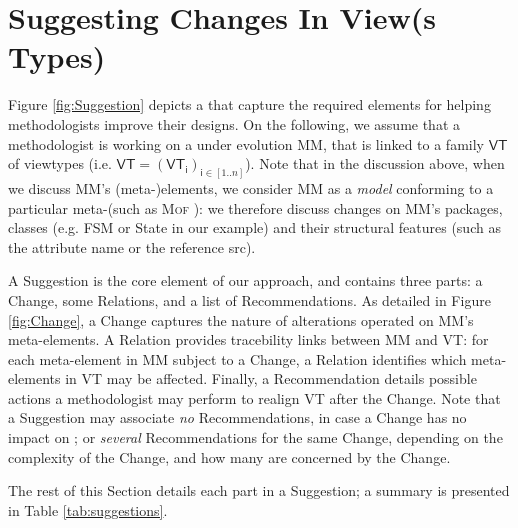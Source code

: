 \section{Suggesting Changes In View(s Types)}
\label{sec:Suggestion}

Figure \ref{fig:Suggestion} depicts a \metamodel that capture the
required elements for helping methodologists improve their designs.
On the following, we assume that a methodologist is working on a \metamodel
under evolution \textsf{MM}, that is linked to a family $\mathsf{VT}$ of viewtypes
(i.e. $\mathsf{VT} = (\mathsf{VT}_\mathsf{i})_{\mathsf{i}\in [1..n]}$). Note that in the discussion above, when we discuss
\textsf{MM}'s (meta-)elements, we consider \textsf{MM} as a \emph{model}
conforming to a particular meta-\metamodel (such as \textsc{Mof} \cite{TR:OMG-MOF:2016}):
we therefore discuss changes on \textsf{MM}'s packages, classes (e.g. 
\textsf{FSM} or \textsf{State} in our example) and their structural features
(such as the attribute \textsf{name} or the reference \textsf{src}).

A \textsf{Suggestion} is the core element of our approach, and contains three 
parts: a \textsf{Change}, some \textsf{Relation}s, and a list of 
\textsf{Recommendation}s. 
%
As detailed in Figure \ref{fig:Change}, a \textsf{Change} captures the nature of
alterations operated on \textsf{MM}'s meta-elements. 
A \textsf{Relation} provides tracebility links between \textsf{MM} and \textsf{VT}:
for each meta-element in \textsf{MM} subject to a \textsf{Change}, a \textsf{Relation}
identifies which meta-elements in \textsf{VT} may be affected. 
Finally, a \textsf{Recommendation} details possible actions a methodologist may 
perform to realign \textsf{VT} after the \textsf{Change}. 
Note that a \textsf{Suggestion} may 
associate \emph{no} \textsf{Recommendation}s, in case a \textsf{Change} has no
impact on \viewtypes; or \emph{several} \textsf{Recommendation}s for the same 
\textsf{Change}, depending on the complexity of the \textsf{Change}, and how 
many \viewtypes are concerned by the \textsf{Change}.

The rest of this Section details each part in a \textsf{Suggestion}; a summary
is presented in Table \ref{tab:suggestions}.





